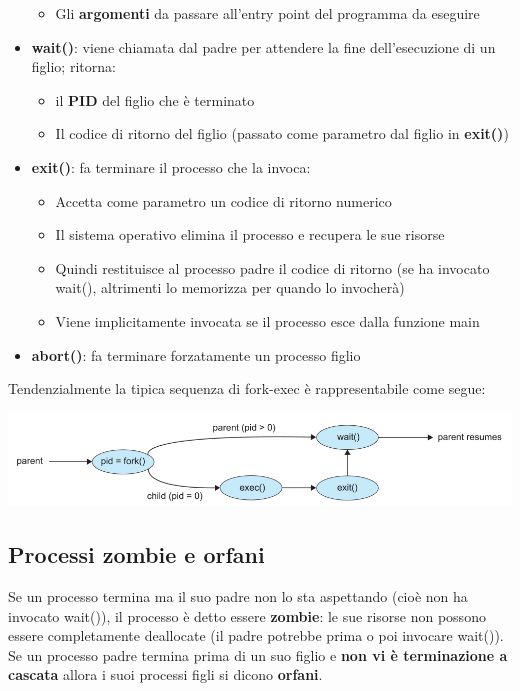 \documentclass[12pt]{article}
\begin{document}
\begin{itemize}
\begin{itemize}
        \item Gli \textbf{argomenti} da passare all'entry point del programma da eseguire
    \end{itemize}
    \item \textbf{wait()}: viene chiamata dal padre per attendere la fine dell'esecuzione di un figlio; ritorna:
    \begin{itemize}
        \item il \textbf{PID} del figlio che è terminato
        \item Il codice di ritorno del figlio (passato come parametro dal figlio in \textbf{exit()})
    \end{itemize}
    \item \textbf{exit()}: fa terminare il processo che la invoca:
    \begin{itemize}
        \item Accetta come parametro un codice di ritorno numerico
        \item Il sistema operativo elimina il processo e recupera le sue risorse
        \item Quindi restituisce al processo padre il codice di ritorno (se ha invocato wait(), altrimenti lo memorizza per quando lo invocherà)
        \item Viene implicitamente invocata se il processo esce dalla funzione main
    \end{itemize}
    \item \textbf{abort()}: fa terminare forzatamente un processo figlio
\end{itemize}
Tendenzialmente la tipica sequenza di fork-exec è rappresentabile come segue:
\begin{center}
    \includegraphics[width = 1\textwidth]{Images/12.PNG}
\end{center}
\subsection{Processi zombie e orfani}
Se un processo termina ma il suo padre non lo sta aspettando (cioè non ha invocato wait()), il processo è detto essere \textbf{zombie}:
le sue risorse non possono essere completamente deallocate (il padre potrebbe prima o poi invocare wait()).
Se un processo padre termina prima di un suo figlio e \textbf{non vi è terminazione a cascata} allora i suoi processi figli si dicono \textbf{orfani}.
\end{document}
